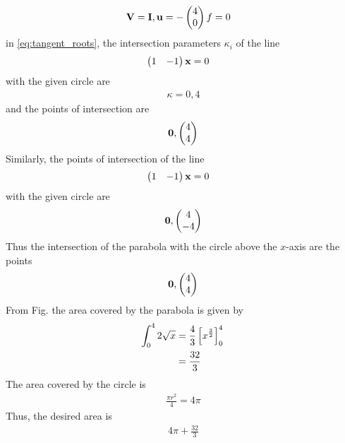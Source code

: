 \documentclass[journal,12pt,twocolumn]{IEEEtran}
\renewcommand\thesection{\arabic{section}}
\begin{document}
\begin{enumerate}[label=\thesection.\arabic*.,ref=\thesection.\theenumi]
\begin{align}
	\\
	\mathbf{V} &= \mathbf{I},
	\mathbf{u} = -\begin{pmatrix}4 \\0\end{pmatrix}
	f = 0
\end{align}
in 
\eqref{eq:tangent_roots}, the intersection parameters $\kappa_i$ of the line 
\begin{align}
	\begin{pmatrix}1 & - 1\end{pmatrix}\mathbf{x} &= 0
\end{align}
with the given circle are
\begin{align}
\kappa = 0, 4 
\end{align}
and the points of intersection are 
\begin{align}
	\mathbf{0}, \begin{pmatrix}4 \\ 4\end{pmatrix}
\end{align}
Similarly, 
the points of intersection of the line 
\begin{align}
	\begin{pmatrix}1 & - 1\end{pmatrix}\mathbf{x} &= 0
\end{align}
with the given circle are 
\begin{align}
	\mathbf{0}, \begin{pmatrix}4 \\ -4\end{pmatrix}
\end{align}
%
Thus the intersection of the parabola with the circle above the $x$-axis are the points 
\begin{align}
	\mathbf{0}, \begin{pmatrix}4 \\ 4\end{pmatrix}
\end{align}
From Fig. 
the area covered by the parabola is given by 
\begin{align}
	\int_{0}^{4}2\sqrt{x} &= \frac{4}{3}{}\left[x^{\frac{3}{2}}\right]_{0}^4{}	
	\\
	&= \frac{32}{3}
\end{align}
The area covered by the circle is
\begin{align}
	\frac{\pi r^2}{4} = 4\pi
\end{align}
Thus, the desired area is 
\begin{align}
 4\pi+ \frac{32}{3}
\end{align}






\end{enumerate}
\end{document}
